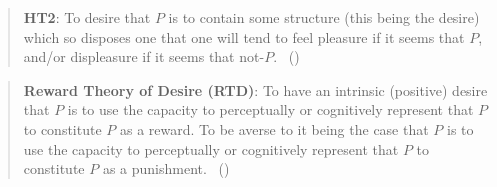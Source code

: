 \documentclass[10pt]{article}
\begin{document}
\begin{quote}
  \textbf{HT2}:
  To desire that \(P\) is to contain some structure (this being the desire) which so disposes one that one will tend to feel pleasure if it seems that \(P\), and/or displeasure if it seems that not-\(P\).\nolinebreak
  \mbox{ }\hfill(\citeyear[27]{Schroeder:2004aa})
\end{quote}


\begin{quote}
  \textbf{Reward Theory of Desire (RTD)}:
  To have an intrinsic (positive) desire that \(P\) is to use the capacity to perceptually or cognitively represent that \(P\) to constitute \(P\) as a reward.
  To be averse to it being the case that \(P\) is to use the capacity to perceptually or cognitively represent that \(P\) to constitute \(P\) as a punishment.
  \mbox{ }\hfill(\citeyear[131]{Schroeder:2004aa})
\end{quote}













\newpage
\printbibliography
\end{document}

